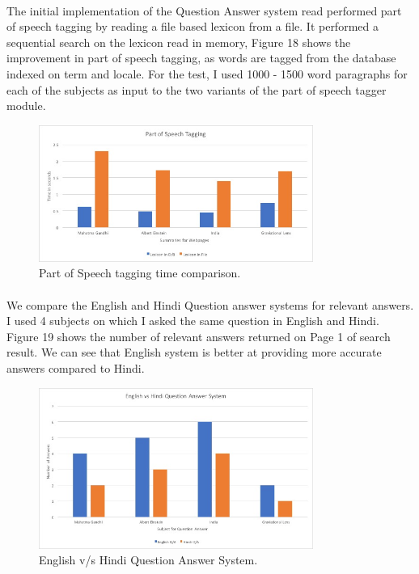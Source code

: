 \paragraph{}
The initial implementation of the Question Answer system read performed part of speech tagging by reading a file based lexicon from a file. It performed a sequential search on the lexicon read in memory, Figure 18 shows the improvement in part of speech tagging, as words are tagged from the database indexed on term and locale. For the test, I used 1000 - 1500 word paragraphs for each of the subjects as input to the two variants of the part of speech tagger module.

\begin{figure}[htb]
\centering
\includegraphics[width=0.8\textwidth]{images/QA_performance2.jpg}
\caption{Part of Speech tagging time comparison.} 
\label{fig:QA_performance2}
\end{figure}
\break

\paragraph{}
We compare the English and Hindi Question answer systems for relevant answers. I used 4 subjects on which I asked the same question in English and Hindi. Figure 19 shows the number of relevant answers returned on Page 1 of search result. We can see that English system is better at providing more accurate answers compared to Hindi.

\begin{figure}[htb]
\centering
\includegraphics[width=0.8\textwidth]{images/QA_performance3.jpg}
\caption{English v/s Hindi Question Answer System.} 
\label{fig:QA_performance3}
\end{figure}